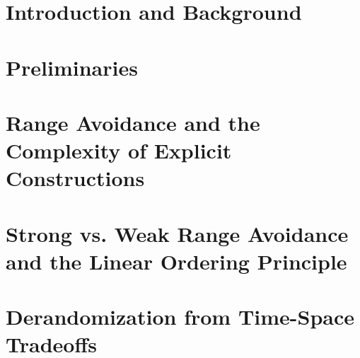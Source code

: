 \documentclass[12pt]{report}
\begin{document}
\doublespacing






\clearpage
{}
\setcounter{page}{1}
\begin{singlespace}
\tableofcontents
\listoffigures
\end{singlespace}

\clearpage
{}
{}


\clearpage
{}
\setcounter{page}{1}

% 

\chapter*{Introduction and Background}
{}
\setcounter{section}{0}
\setcounter{secnumdepth}{0}

\setcounter{secnumdepth}{3}

\chapter*{Preliminaries}
\setcounter{chapter}{-1}
\label{chap:prelims}


\chapter{Range Avoidance and the Complexity of Explicit Constructions}\label{chap:range}


\chapter{Strong vs. Weak Range Avoidance and the  Linear Ordering Principle}\label{chap:lop}


\chapter{Derandomization from Time-Space Tradeoffs}\label{chap:lossy}

\end{document}
